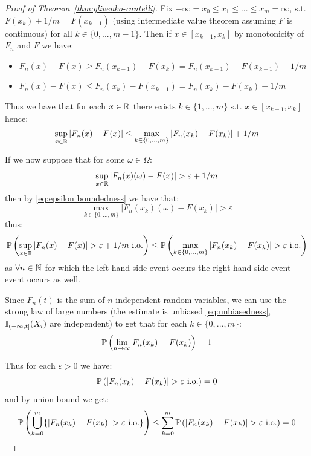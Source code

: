 \begin{proof}[Proof of Theorem~\ref{thm:glivenko-cantelli}]
    Fix $-\infty = x_0 \leq x_1 \leq ... \leq x_m = \infty$, s.t. $F(x_k) + 1/m = F(x_{k + 1})$ (using intermediate value theorem assuming $F$ is continuous) for all $k \in \{0, ..., m - 1\}$. Then if $x \in [x_{k-1}, x_k]$ by monotonicity of $F_n$ and $F$ we have:
    \begin{itemize}    
        \item $F_n(x) - F(x)
                  \geq F_n(x_{k-1}) - F(x_{k})
                  = F_n(x_{k-1}) - F(x_{k-1}) - 1/m$
        \item $F_n(x) - F(x)
                  \leq F_n(x_{k}) - F(x_{k - 1})
                  = F_n(x_{k}) - F(x_{k}) + 1/m$
    \end{itemize}
    
    Thus we have that for each $x \in \R$ there exists $k \in \{1, ..., m\}$ s.t. $x \in [x_{k-1}, x_k]$ hence:
    \begin{equation} \label{eq:epsilon boundedness}
        \begin{split}    
            \sup_{x \in \R} |F_n(x) - F(x)| \leq \max_{k \in \{0, ..., m\}} |F_n(x_{k}) - F(x_{k})| + 1/m
        \end{split}
    \end{equation}
    
    If we now suppose that for some $\omega \in \Omega$:
    \[\sup_{x \in \R} |F_n(x)(\omega) - F(x)| > \varepsilon + 1/m\]
    then by \eqref{eq:epsilon boundedness} we have that:
    \[\max_{k \in \{0, ..., m\}} |F_n(x_{k})(\omega) - F(x_{k})| > \varepsilon\]
    thus:
    \begin{equation} \label{eq:probability monotonicity}
        \P\left(\sup_{x \in \R} |F_n(x) - F(x)| > \varepsilon + 1/m \text{ i.o.} \right)
        \leq \P\left(\max_{k \in \{0, ..., m\}} |F_n(x_{k}) - F(x_{k})| > \varepsilon \text{ i.o.} \right)
    \end{equation}
    as $\forall n \in \N$ for which the left hand side event occurs the right hand side event event occurs as well.
    
    Since $F_n(t)$ is the sum of $n$ independent random variables, we can use the strong law of large numbers (the estimate is unbiased \eqref{eq:unbiasedness}, $\I_{(-\infty,t]}(X_i)$ are independent) to get that for each $k \in \{0, ..., m\}$:
    \[\P \left(\lim_{n \to \infty} F_n(x_k) = F(x_k)\right) = 1\]
    
    Thus for each $\varepsilon > 0$ we have:
    \[\P \left(|F_n(x_k) - F(x_k)| > \varepsilon \text{ i.o.}\right) = 0\]
    and by union bound we get:
    \[\P \left(\bigcup_{k=0}^{m} \{|F_n(x_k) - F(x_k)| > \varepsilon \text{ i.o.}\}\right)
        \leq \sum_{k=0}^{m} \P \left(|F_n(x_k) - F(x_k)| > \varepsilon \text{ i.o.}\right) = 0\]
    

\end{proof}
